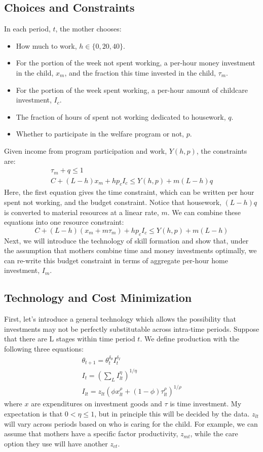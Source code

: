 \documentclass[12pt]{article}
\numberwithin{equation}{section}
\numberwithin{figure}{section}
\numberwithin{table}{section}
\begin{document}
\subsection{Choices and Constraints}
In each period, $t$, the mother chooses:
\begin{itemize}
\item How much to work, $h\in\{0,20,40\}$.
\item For the portion of the week not spent working, a per-hour money investment in the child, $x_m$, and the fraction this time invested in the child, $\tau_m$.
\item For the portion of the week spent working, a per-hour amount of childcare investment, $I_c$.
\item The fraction of hours of spent not working dedicated to housework, $q$.
\item Whether to participate in the welfare program or not, $p$.
\end{itemize}
Given income from program participation and work, $Y(h,p)$, the constraints are:
\begin{eqnarray}
\tau_m + q \leq 1 \\
C + (L-h)x_m + hp_cI_c \leq Y(h,p) + m(L-h)q
\end{eqnarray}
Here, the first equation gives the time constraint, which can be written per hour spent not working, and the budget constraint. Notice that housework, $(L-h)q$ is converted to material resources at a linear rate, $m$.
We can combine these equations into one resource constraint:
\[ C + (L-h)(x_m + m\tau_m) + hp_cI_c \leq Y(h,p) + m(L-h) \]
Next, we will introduce the technology of skill formation and show that, under the assumption that mothers combine time and money investments optimally, we can re-write this budget constraint in terms of aggregate per-hour home investment, $I_m$.

\subsection{Technology and Cost Minimization}
First, let's introduce a general technology which allows the possibility that investments may not be perfectly substitutable across intra-time periods. Suppose that there are L stages within time period $t$. We define production with the following three equations:
\begin{eqnarray}
\theta_{t+1} = \theta_t^{\delta_\theta} I_t^{\delta_I} \\
I_t = \left(\sum_L I_{lt}^\eta \right)^{1/\eta} \\
I_{lt} = z_{lt}\left(\phi x_{lt}^\rho + (1-\phi) \tau_{lt}^\rho \right)^{1/\rho}
\end{eqnarray}
where $x$ are expenditures on investment goods and $\tau$ is time investment. My expectation is that $0<\eta\leq 1$, but in principle this will be decided by the data. $z_{lt}$ will vary across periods based on who is caring for the child. For example, we can assume that mothers have a specific factor productivity, $z_{mt}$, while the care option they use will have another $z_{ct}$.
\end{document}
